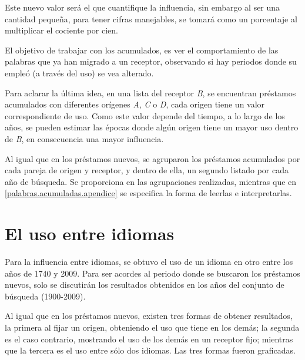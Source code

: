 \begin{enumerate}
	Este  nuevo valor será el que cuantifique la influencia, sin embargo al ser una cantidad pequeña, para tener cifras manejables, se tomará como un porcentaje al multiplicar el cociente por cien. 
	
	
	
\end{enumerate}

El objetivo de trabajar con los acumulados, es ver el comportamiento de las palabras que ya han migrado a un receptor, observando si hay periodos donde su empleó (a través del uso) se vea alterado. 

Para aclarar la última idea, en una lista del receptor \textit{B}, se encuentran  préstamos acumulados con diferentes orígenes \textit{A}, \textit{C} o \textit{D}, cada origen tiene un valor correspondiente de uso. Como este valor depende del tiempo, a lo largo de los años, se pueden estimar las épocas donde algún origen tiene un mayor uso dentro de \textit{B},  en consecuencia una mayor influencia. 

Al igual que en los préstamos nuevos,  se agruparon los préstamos acumulados por cada pareja de origen y receptor,  y dentro de ella, un segundo listado por cada año de búsqueda.  Se proporciona en \cite{prestamos_acumulados} las agrupaciones realizadas, mientras que en \ref{palabras.acumuladas.apendice} se especifica la forma de leerlas e interpretarlas. 



\section {El uso entre idiomas} 

Para la influencia entre idiomas, se obtuvo el uso de un idioma en otro entre los años de 1740 y 2009. Para ser acordes al periodo donde se buscaron los préstamos nuevos, solo se discutirán los resultados obtenidos en los años del conjunto de búsqueda (1900-2009).

Al igual que en los préstamos nuevos, existen tres formas de obtener resultados,  la primera al fijar un origen, obteniendo el uso que tiene en los demás; la segunda es el caso contrario,  mostrando el uso de los demás en un receptor fijo;  mientras que la tercera es el uso entre sólo dos idiomas.  Las tres formas fueron graficadas. 

